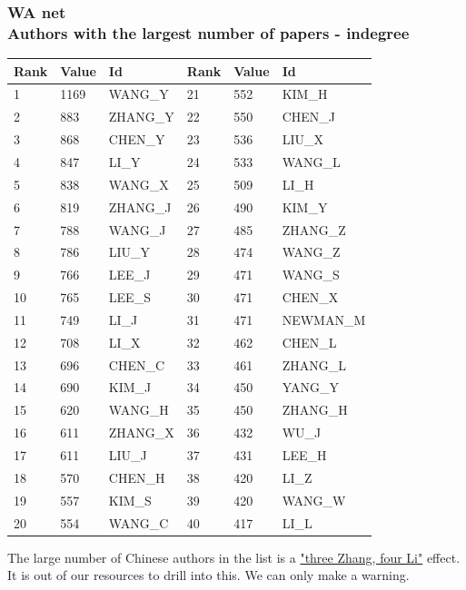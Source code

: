 \documentclass[hyperref={pdfstartview={FitBH -32768},
                         pdfpagemode=FullScreen,
                         plainpages=false,
                         colorlinks=true}
              ]{beamer}
\begin{document}
\begin{frame}[fragile]
\frametitle{WA net \label{numpap}\\ \normalsize Authors with the largest number of papers - indegree}

\renewcommand{\arraystretch}{0.82}
\tiny
\begin{center}
\begin{tabular}{l|l|l||l|l|l}
Rank& 	Value& 	Id& 	Rank& 	Value& 	Id\\  \hline   
1& 	1169& 	WANG\_Y& 	21& 	552& 	KIM\_H\\ 
2& 	883& 	ZHANG\_Y& 	22& 	550& 	CHEN\_J\\ 
3& 	868& 	CHEN\_Y& 	23& 	536& 	LIU\_X\\ 
4& 	847& 	LI\_Y& 	24& 	533& 	WANG\_L\\ 
5& 	838& 	WANG\_X& 	25& 	509& 	LI\_H\\ 
6& 	819& 	ZHANG\_J& 	26& 	490& 	KIM\_Y\\ 
7& 	788& 	WANG\_J& 	27& 	485& 	ZHANG\_Z\\ 
8& 	786& 	LIU\_Y& 	28& 	474& 	WANG\_Z\\ 
9& 	766& 	LEE\_J& 	29& 	471& 	WANG\_S\\ 
10& 	765& 	LEE\_S& 	30& 	471& 	CHEN\_X\\ 
11& 	749& 	LI\_J& 	31& 	471& 	NEWMAN\_M\\ 
12& 	708& 	LI\_X& 	32& 	462& 	CHEN\_L\\ 
13& 	696& 	CHEN\_C& 	33& 	461& 	ZHANG\_L\\ 
14& 	690& 	KIM\_J& 	34& 	450& 	YANG\_Y\\ 
15& 	620& 	WANG\_H& 	35& 	450& 	ZHANG\_H\\ 
16& 	611& 	ZHANG\_X& 	36& 	432& 	WU\_J\\ 
17& 	611& 	LIU\_J& 	37& 	431& 	LEE\_H\\ 
18& 	570& 	CHEN\_H& 	38& 	420& 	LI\_Z\\ 
19& 	557& 	KIM\_S& 	39& 	420& 	WANG\_W\\ 
20& 	554& 	WANG\_C& 	40& 	417& 	LI\_L\\ \hline  
\end{tabular}
\end{center}

\medskip

The large number of Chinese authors in the list is a \href{https://en.wikipedia.org/wiki/List_of_common_Chinese_surnames}{"three Zhang, four Li"} effect. It is out of our resources to drill into this. We can only make a warning.

\end{frame}
\end{document}
